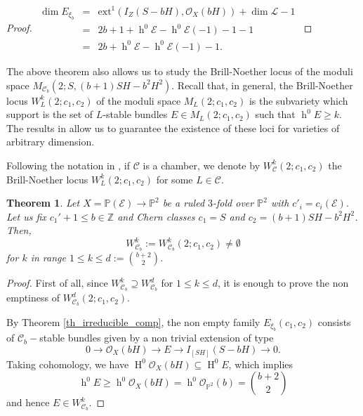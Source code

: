 \documentclass[11pt,twoside]{amsart}
\newtheorem{theorem}{Theorem}[section]
\theoremstyle{definition}
\newcommand {\ext}{\mathrm{ext}}
\newcommand{\h}{\operatorname{h}}
\newcommand{\Ho}{\operatorname{H}}
\begin{document}
\begin{proof}
$\begin{array}{rrl}
 \dim E_{\xi_b}&=&\ext^1 (I_Z(S-bH),\mathcal{O}_X(bH))+\dim\mathcal{L}-1    \\ &=&2b+1+\h^0\mathcal{E}-\h^0\mathcal{E}(-1)-1-1\\ 
     & =& 2b+\h^0\mathcal{E}-\h^0\mathcal{E}(-1)-1.
\end{array}$
 \end{proof}




The above theorem  also allows us to study the Brill-Noether locus of the moduli space $M_{\mathcal{C}_b}(2;S,(b+1)SH-b^2H^2)$. Recall that, in general,  the Brill-Noether locus $W_L^k(2;c_1,c_2)$ of the moduli space $ M_L(2;c_1,c_2)$ is the subvariety which support is the set of $L$-stable bundles $E\in M_L(2;c_1,c_2)$ such that $\h^0E\geq k$.  
  The results in \cite{higherBN} allow us to guarantee the existence of these loci for  varieties of arbitrary dimension. %

Following the notation in \cite{nuestro_ruled}, if $\mathcal{C}$ is a chamber, we denote by $W_\mathcal{C}^k(2;c_1,c_2)$ the Brill-Noether locus $W_L^k(2;c_1,c_2)$ for some $L\in \mathcal{C}$.


\begin{theorem}
\label{BN}
    Let $X=\mathbb{P}(\mathcal{E})\rightarrow\mathbb{P}^2$ be a ruled $3$-fold over $\mathbb{P}^2$ with $c'_i=c_i(\mathcal{E})$.  Let us fix $c_1'+1\leq b\in\mathbb{Z}$ and Chern classes $c_1=S$ and $c_2=(b+1)SH-b^2H^2$. %
    Then, $$W_{\mathcal{C}_b}^k:=W_{\mathcal{C}_b}^k(2;c_1,c_2)\neq\emptyset$$ for $k$ in range $1\leq k\leq d:=\binom{b+2}{2}$.
\end{theorem}

\begin{proof} 
  First of all, since $W_{\mathcal{C}_b}^{k}\supseteq W_{\mathcal{C}_b}^d$ for  $1\leq k\leq d$, it is enough to prove the non emptiness of $W_{\mathcal{C}_b}^d(2;c_1,c_2)$.
  
By Theorem \ref{th_irreducible_comp}, the non empty family $ E_{\xi_b}(c_1,c_2)$ consists of $\mathcal{C}_b-$stable bundles given by a non trivial extension of type $$0\rightarrow \mathcal{O}_X(bH)\rightarrow E\rightarrow I_{[SH]}(S-bH)\rightarrow0.$$ Taking cohomology, we have $\Ho^0\mathcal{O}_X(bH)\subseteq \Ho^0E$, which implies $$\h^0E\geq \h^0\mathcal{O}_X(bH)=\h^0\mathcal{O}_{\mathbb{P}^2}(b)=\binom{b+2}{2}$$ and hence $E\in W_{\mathcal{C}_b}^k$.%
\end{proof}
\end{document}
